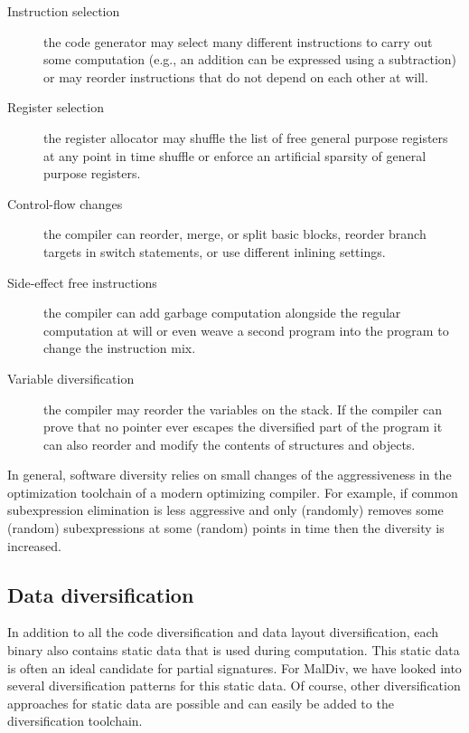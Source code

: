 \documentclass[10pt, preprint]{sigplanconf}
\begin{document}
\begin{description}
\item[Instruction selection] the code generator may select many different
instructions to carry out some computation (e.g., an addition can be expressed
using a subtraction) or may reorder instructions that do not depend on each
other at will.

\item[Register selection] the register allocator may shuffle the list of free
general purpose registers at any point in time shuffle or enforce an artificial
sparsity of general purpose registers.

\item[Control-flow changes] the compiler can reorder, merge, or split basic
blocks, reorder branch targets in switch statements, or use different inlining
settings.

\item[Side-effect free instructions] the compiler can add garbage computation
alongside the regular computation at will or even weave a second program into
the program to change the instruction mix.

\item[Variable diversification] the compiler may reorder the variables on the
stack. If the compiler can prove that no pointer ever escapes the diversified
part of the program it can also reorder and modify the contents of structures
and objects.

\end{description}

In general, software diversity relies on small changes of the aggressiveness in
the optimization toolchain of a modern optimizing compiler. For example, if
common subexpression elimination is less aggressive and only (randomly) removes
some (random) subexpressions at some (random) points in time then the diversity
is increased.


\subsection{Data diversification}

In addition to all the code diversification and data layout diversification,
each binary also contains static data that is used during computation. This
static data is often an ideal candidate for partial signatures. For MalDiv, we
have looked into several diversification patterns for this static data. Of
course, other diversification approaches for static data are possible and can
easily be added to the diversification toolchain.
\end{document}
